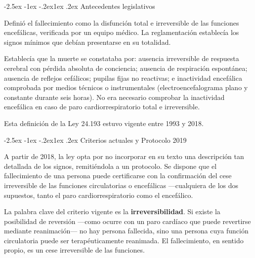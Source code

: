 \documentclass[12pt,oneside]{book}
\makeatletter
\renewcommand\subsection{\@startsection{subsection}{2}{\z@}%
  {-2.5ex \@plus -1ex \@minus -.2ex}{1ex \@plus .2ex}%
  {\normalfont\normalsize\bfseries}}
\makeatother
\begin{document}
\subsection{Antecedentes legislativos}

\begin{regla}
Definió el fallecimiento como la disfunción total e irreversible de las funciones encefálicas, verificada por un equipo médico. La reglamentación establecía los signos mínimos que debían presentarse en su totalidad.
\end{regla}

\begin{regla}
Establecía que la muerte se constataba por: ausencia irreversible de respuesta cerebral con pérdida absoluta de conciencia; ausencia de respiración espontánea; ausencia de reflejos cefálicos; pupilas fijas no reactivas; e inactividad encefálica comprobada por medios técnicos o instrumentales (electroencefalograma plano y constante durante seis horas). No era necesario comprobar la inactividad encefálica en caso de paro cardiorrespiratorio total e irreversible.
\end{regla}

Esta definición de la Ley 24.193 estuvo vigente entre 1993 y 2018.

\subsection{Criterios actuales y Protocolo 2019}

A partir de 2018, la ley opta por no incorporar en su texto una descripción tan detallada de los signos, remitiéndola a un protocolo. Se dispone que el fallecimiento de una persona puede certificarse con la confirmación del cese irreversible de las funciones circulatorias o encefálicas ---cualquiera de los dos supuestos, tanto el paro cardiorrespiratorio como el encefálico.

\begin{importante}
La palabra clave del criterio vigente es la \textbf{irreversibilidad}. Si existe la posibilidad de reversión ---como ocurre con un paro cardíaco que puede revertirse mediante reanimación--- no hay persona fallecida, sino una persona cuya función circulatoria puede ser terapéuticamente reanimada. El fallecimiento, en sentido propio, es un cese irreversible de las funciones.
\end{importante}
\end{document}
